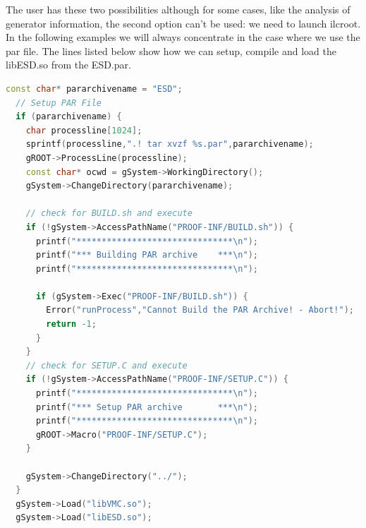 The user has these two possibilities although for some cases, like the analysis of generator information, the second option can't be used: we need to launch ilcroot. In the following examples we will always concentrate in the case where we use the {\ttfamily par file}. The lines listed below show how we can setup, compile and load the libESD.so from the {\ttfamily ESD.par}.

\vspace{2 cm}

\begin{lstlisting}[language=C++]
  const char* pararchivename = "ESD";
  // Setup PAR File
  if (pararchivename) {
    char processline[1024];
    sprintf(processline,".! tar xvzf %s.par",pararchivename);
    gROOT->ProcessLine(processline);
    const char* ocwd = gSystem->WorkingDirectory();
    gSystem->ChangeDirectory(pararchivename);

    // check for BUILD.sh and execute
    if (!gSystem->AccessPathName("PROOF-INF/BUILD.sh")) {
      printf("*******************************\n");
      printf("*** Building PAR archive    ***\n");
      printf("*******************************\n");

      if (gSystem->Exec("PROOF-INF/BUILD.sh")) {
        Error("runProcess","Cannot Build the PAR Archive! - Abort!");
        return -1;
      }
    }
    // check for SETUP.C and execute
    if (!gSystem->AccessPathName("PROOF-INF/SETUP.C")) {
      printf("*******************************\n");
      printf("*** Setup PAR archive       ***\n");
      printf("*******************************\n");
      gROOT->Macro("PROOF-INF/SETUP.C");
    }
    
    gSystem->ChangeDirectory("../");
  }
  gSystem->Load("libVMC.so");
  gSystem->Load("libESD.so");
\end{lstlisting}

